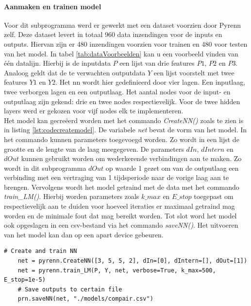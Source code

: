 			\paragraph{Aanmaken en trainen model}
			Voor dit subprogramma werd er gewerkt met een dataset voorzien door Pyrenn zelf. Deze dataset levert in totaal 960 data inzendingen voor de inputs en outputs. Hiervan zijn er 480 inzendingen voorzien voor trainen en 480 voor testen van het model. In tabel \ref{tab:dataVoorbeelden} kan u een voorbeeld vinden van \'e\'en datalijn. Hierbij is de inputdata $P$ een lijst van drie features $P1$, $P2$ en $P3$. Analoog geldt dat de te verwachten outputdata $Y$ een lijst voorstelt met twee features $Y1$ en $Y2$. Het \gls{nn} wordt hier gedefinieerd door vier lagen. Een inputlaag, twee verborgen lagen en een outputlaag. Het aantal nodes voor de input- en outputlaag zijn gekend: drie en twee nodes respectievelijk. Voor de twee hidden layers werd er gekozen voor vijf nodes elk te implementeren.\\
			Het model kan gecre\"eerd worden met het commando \textit{CreateNN()} zoals te zien is in listing \ref{lst:codecreatemodel}. De variabele \textit{net} bevat de vorm van het model. In het commando kunnen parameters toegevoegd worden. Zo wordt in een lijst de grootte en de lengte van de laag meegegeven. De parameters $dIn$, $dIntern$ en $dOut$ kunnen gebruikt worden om wederkerende verbindingen aan te maken. Zo wordt in dit subprogramma $dOut$ op waarde 1 gezet om van de outputlaag een verbinding met een vertraging van 1 tijdsperiode naar de vorige laag aan te brengen. Vervolgens wordt het model getraind met de data met het commando \textit{train\_LM()}. Hierbij worden parameters zoals $k\_max$ en $E\_stop$ toegepast om respectievelijk aan te duiden voor hoeveel iteraties er maximaal getraind mag worden en de minimale fout dat mag bereikt worden. Tot slot word het model ook opgeslagen in een \gls{csv}-bestand via het commando \textit{saveNN()}. Het uitvoeren van het model kan dan op een apart device gebeuren. 

			\begin{lstlisting}[caption={Cre\"eren en trainen van pyrenn-model.},captionpos=b, label = {lst:codecreatemodel}]
	# Create and train NN
	net = pyrenn.CreateNN([3, 5, 5, 2], dIn=[0], dIntern=[], dOut=[1])
	net = pyrenn.train_LM(P, Y, net, verbose=True, k_max=500, E_stop=1e-5)
	# Save outputs to certain file
	prn.saveNN(net, "./models/compair.csv")
			\end{lstlisting}
			
